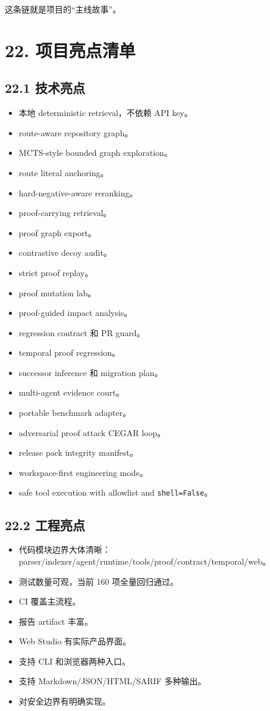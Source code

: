\documentclass[UTF8,12pt,openany]{ctexbook}
\begin{document}
这条链就是项目的“主线故事”。\par

\section{22. 项目亮点清单}

\subsection{22.1 技术亮点}

\begin{itemize}
\item 本地 deterministic retrieval，不依赖 API key。
\item route-aware repository graph。
\item MCTS-style bounded graph exploration。
\item route literal anchoring。
\item hard-negative-aware reranking。
\item proof-carrying retrieval。
\item proof graph export。
\item contrastive decoy audit。
\item strict proof replay。
\item proof mutation lab。
\item proof-guided impact analysis。
\item regression contract 和 PR guard。
\item temporal proof regression。
\item successor inference 和 migration plan。
\item multi-agent evidence court。
\item portable benchmark adapter。
\item adversarial proof attack CEGAR loop。
\item release pack integrity manifest。
\item workspace-first engineering mode。
\item safe tool execution with allowlist and \texttt{shell=False}。
\end{itemize}

\subsection{22.2 工程亮点}

\begin{itemize}
\item 代码模块边界大体清晰：parser/indexer/agent/runtime/tools/proof/contract/temporal/web。
\item 测试数量可观，当前 160 项全量回归通过。
\item CI 覆盖主流程。
\item 报告 artifact 丰富。
\item Web Studio 有实际产品界面。
\item 支持 CLI 和浏览器两种入口。
\item 支持 Markdown/JSON/HTML/SARIF 多种输出。
\item 对安全边界有明确实现。
\end{itemize}
\end{document}
